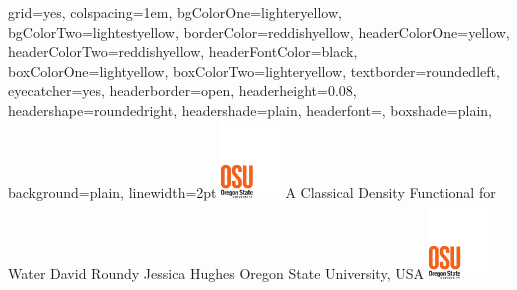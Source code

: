 \documentclass[landscape,a0paper,final,showframe]{baposter}
\begin{document}

\begin{poster}{
  grid=yes,
  colspacing=1em,
  bgColorOne=lighteryellow,
  bgColorTwo=lightestyellow,
  borderColor=reddishyellow,
  headerColorOne=yellow,
  headerColorTwo=reddishyellow,
  headerFontColor=black,
  boxColorOne=lightyellow,
  boxColorTwo=lighteryellow,
  textborder=roundedleft,
  eyecatcher=yes,
  headerborder=open,
  headerheight=0.08\textheight,
  headershape=roundedright,
  headershade=plain,
  headerfont=\Large\textsf, %
  boxshade=plain,
  background=plain,
  linewidth=2pt
  }
  { %
    \includegraphics[height=5.5em]{figs/osu-logo}
  }
  {\sf %
  A Classical Density Functional for Water}
  {\sf %
  David Roundy\hspace{3em}
  Jessica Hughes\hspace{3em}
  Oregon State University, USA
  }
  {
    \includegraphics[height=5.5em]{figs/osu-logo}
  }


\end{poster}
\end{document}
